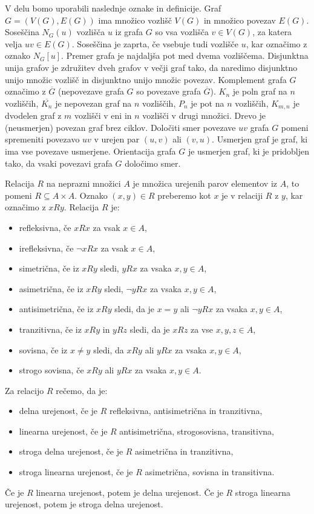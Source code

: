 \documentclass[a4paper, 12pt]{book}
\begin{document}
V delu bomo uporabili naslednje oznake in definicije.
Graf $G = (V(G), E(G))$ ima množico vozlišč $V(G)$ in množico povezav $E(G)$. Soseščina $N_G(u)$ vozlišča $u$ iz grafa $G$ so vsa vozlišča $v \in V(G)$, za katera velja $uv \in E(G)$. Soseščina je zaprta, če vsebuje tudi vozlišče $u$, kar označimo z oznako $N_G[u]$. Premer grafa je najdaljša pot med dvema vozliščema. Disjunktna unija grafov je združitev dveh grafov v večji graf tako, da naredimo disjunktno unijo množic vozlišč in disjunktno unijo množic povezav. Komplement grafa $G$ označimo z $\overline{G}$ (nepovezave grafa $G$ so povezave grafa $\overline{G}$). $K_n$ je poln graf na $n$ vozliščih, $\overline{K_n}$ je nepovezan graf na $n$ vozliščih, $P_n$ je pot na $n$ vozliščih, $K_{m, n}$ je dvodelen graf z $m$ vozlišči v eni in $n$ vozlišči v drugi množici. Drevo je (neusmerjen) povezan graf brez ciklov. Določiti smer povezave $uv$ grafa $G$ pomeni spremeniti povezavo $uv$ v urejen par $(u, v)$ ali $(v, u)$. Usmerjen graf je graf, ki ima vse povezave usmerjene. Orientacija grafa $G$ je usmerjen graf, ki je pridobljen tako, da vsaki povezavi grafa $G$ določimo smer.

Relacija $R$ na neprazni množici $A$ je množica urejenih parov elementov iz $A$, to pomeni $R\subseteq A\times A$. Oznako $(x, y) \in R$ preberemo kot $x$ je v relaciji $R$ z $y$, kar označimo z $xRy$. Relacija $R$ je:
\begin{itemize}
    \item refleksivna, če $xRx$ za vsak $x\in A$,
    \item irefleksivna, če $\neg xRx$ za vsak $x\in A$,
    \item simetrična, če iz $xRy$ sledi, $yRx$ za vsaka $x,y\in A$,
    \item asimetrična, če iz $xRy$ sledi, $\neg yRx$ za vsaka $x,y\in A$,
    \item antisimetrična, če iz $xRy$ sledi, da je $x = y$ ali $\neg yRx$ za vsaka $x,y\in A$,
    \item tranzitivna, če iz $xRy$ in $yRz$ sledi, da je $xRz$ za vse $x,y,z\in A$,
    \item sovisna, če iz $x \neq y$ sledi, da $xRy$ ali $yRx$ za vsaka $x,y\in A$,
    \item strogo sovisna, če $xRy$ ali $yRx$ za vsaka $x,y\in A$.
\end{itemize}
Za relacijo $R$ rečemo, da je:
\begin{itemize}
    \item delna urejenost, če je $R$ refleksivna, antisimetrična in tranzitivna,
    \item linearna urejenost, če je $R$ antisimetrična, strogosovisna, transitivna,
    \item stroga delna urejenost, če je $R$ asimetrična in tranzitivna,
    \item stroga linearna urejenost, če je $R$ asimetrična, sovisna in transitivna.
\end{itemize}
Če je $R$ linearna urejenost, potem je delna urejenost. Če je $R$ stroga linearna urejenost, potem je stroga delna urejenost.
\end{document}
